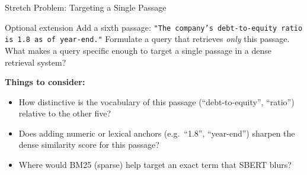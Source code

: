 \documentclass[9pt,t]{beamer}
\begin{document}

\begin{frame}[noframenumbering]{Stretch Problem: Targeting a Single Passage}

\begin{block}{Optional extension}
Add a sixth passage: \texttt{"The company's debt-to-equity ratio is 1.8 as of year-end."}
Formulate a query that retrieves \emph{only} this passage. What makes a query specific
enough to target a single passage in a dense retrieval system?
\end{block}

\medskip
\textbf{Things to consider:}
\begin{itemize}
  \item How distinctive is the vocabulary of this passage (``debt-to-equity'',
        ``ratio'') relative to the other five?
  \item Does adding numeric or lexical anchors (e.g.\ ``1.8'', ``year-end'')
        sharpen the dense similarity score for this passage?
  \item Where would BM25 (sparse) help target an exact term that SBERT blurs?
\end{itemize}
\end{frame}
\end{document}
